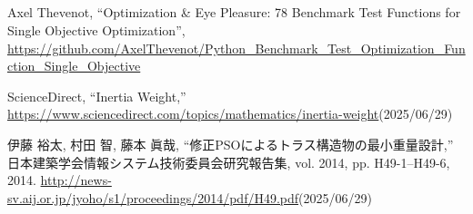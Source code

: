 \begin{center}
	\section*{}                      %
	\vspace*{-2zh}
\end{center}


\begin{thebibliography}{99}
	
	Axel Thevenot, ``Optimization \& Eye Pleasure: 78 Benchmark Test Functions for Single Objective Optimization'',\\
	\url{https://github.com/AxelThevenot/Python_Benchmark_Test_Optimization_Function_Single_Objective}

ScienceDirect, “Inertia Weight,”  
\url{https://www.sciencedirect.com/topics/mathematics/inertia-weight}(2025/06/29)


伊藤 裕太, 村田 智, 藤本 眞哉, “修正PSOによるトラス構造物の最小重量設計,” 日本建築学会情報システム技術委員会研究報告集, vol. 2014, pp. H49-1–H49-6, 2014.  
\url{http://news-sv.aij.or.jp/jyoho/s1/proceedings/2014/pdf/H49.pdf}(2025/06/29)

	

	
	\end{thebibliography}